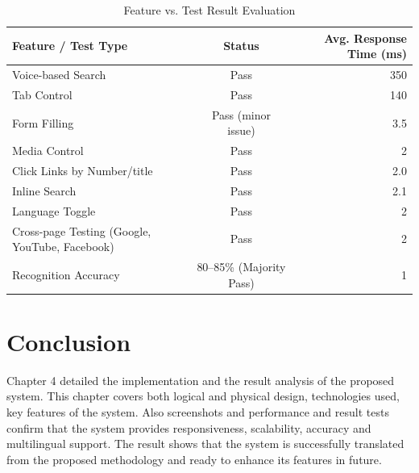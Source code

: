 \begin{table}[H]
    \centering
    \caption{Feature vs. Test Result Evaluation\cite{voiceweb_test_results}}
    \label{tab:feature_test_results_professional}
    \begin{tabularx}{\textwidth}{>{\RaggedRight\arraybackslash}X c r}
        \toprule
        \textbf{Feature / Test Type} & \textbf{Status} & \textbf{Avg. Response Time (ms)} \\
        \midrule
        Voice-based Search                  & \textcolor{green!70!black}{Pass} & 350 \\ 
        Tab Control                         & \textcolor{green!70!black}{Pass} & 140 \\ 
        Form Filling                        & \textcolor{orange!80!black}{Pass (minor issue)} & 3.5 \\ 
        Media Control                     & \textcolor{green!70!black}{Pass} & 2 \\  
        Click Links by Number/title      &   
        \textcolor{green!70!black}{Pass} & 2.0 \\
        Inline Search                    &   \textcolor{green!70!black}{Pass} & 2.1 \\
        Language Toggle                     & \textcolor{green!70!black}{Pass} &  2 \\
        Cross-page Testing (Google, YouTube, Facebook) & \textcolor{green!70!black}{Pass} & 2 \\
        Recognition Accuracy                & \textcolor{blue!70!black}{80--85\% (Majority Pass)} & 1 \\
        \bottomrule
    \end{tabularx}
\end{table}


\section{Conclusion}
Chapter 4 detailed the implementation and the result analysis of the proposed system. This chapter covers both logical and physical design, technologies used, key features of the system. Also screenshots and performance and result tests confirm that the system provides responsiveness, scalability, accuracy and multilingual support. The result shows that the system is successfully translated from the proposed methodology and ready to enhance its features in future.






